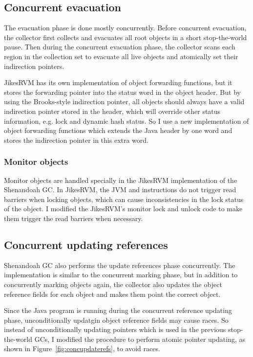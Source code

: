 \subsection{Concurrent evacuation}

The evacuation phase is done mostly concurrently. Before concurrent evacuation,
the collector first collects and evacuates all root objects in a short stop-the-world pause.
Then during the concurrent evacuation phase, the collector scans each region in the
collection set to evacuate all live objects and atomically set their indirection
pointers.

JikesRVM has its own implementation of object forwarding functions, but it stores the forwarding
pointer into the status word in the object header. But by using the Brooks-style indirection
pointer, all objects should always have a valid indirection pointer stored in the header, which will override other status
information, e.g. lock and dynamic hash status. So I use a new implementation of
object forwarding functions which extends the Java header by one word and stores the indirection
pointer in this extra word.

\subsubsection{Monitor objects}

Monitor objects are handled specially in the JikesRVM implementation of the Shenandoah GC.
In JikesRVM, the JVM  and  instructions
do not trigger read barriers when locking objects, which can cause inconsistencies 
in the lock status of the object. I modified the JikesRVM's monitor lock and unlock
code to make them trigger the read barriers when necessary.

\subsection{Concurrent updating references}

Shenandoah GC also performs the update references phase concurrently.
The implementation is similar to the concurrent marking phase, but in addition to
concurrently marking objects again, the collector also updates the object reference fields
for each object and makes them point the correct object.

Since the Java program is running during the concurrent reference updating phase,
unconditionally updatgin object reference fields may cause races. So instead of
unconditionally updating pointers which is used in the previous stop-the-world GCs,
I modified the procedure to perform
atomic pointer updating, as shown in Figure~\ref{fig:concupdaterefs},
to avoid races.

